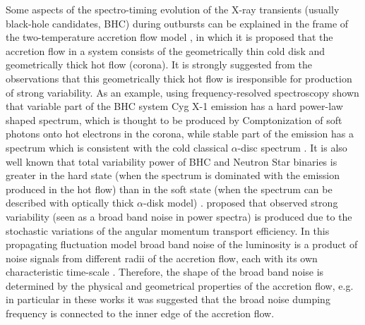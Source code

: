 \documentclass[a4paper,fleqn,usenatbib]{mnras}
\begin{document}
Some aspects of the spectro-timing evolution of the X-ray transients (usually black-hole candidates, BHC) during outbursts can be explained in the frame of the two-temperature accretion flow model \citep{1975ApJ...199L.153E, 1976ApJ...204..187S, 1995ApJ...452..710N}, in which it is proposed that the accretion flow in a system consists of the geometrically thin cold disk and geometrically thick hot flow (corona). 
It is strongly suggested from the observations that this geometrically thick hot flow is iresponsible for production of strong variability. 
As an example, using frequency-resolved spectroscopy \citet{2001MNRAS.321..759C} shown that variable part of the BHC system Cyg X-1 emission has a hard power-law shaped spectrum, which is thought to be produced by Comptonization of soft photons onto hot electrons in the corona, while stable part of the emission has a spectrum which is consistent with the cold classical $\alpha$-disc spectrum \citep{shakura73}.  
It is also well known that total variability power of BHC and Neutron Star binaries is greater in the hard state (when the spectrum is dominated with the emission produced in the hot flow) than in the soft state (when the spectrum can be described with optically thick $\alpha$-disk model) \citep[][e.t.c.]{1992ApJ...391L..21M, 2000A&A...363.1013R, 2001ApJS..132..377H, 2001MNRAS.321..759C}. 
\citet{1997MNRAS.292..679L} proposed that observed strong variability (seen as a broad band noise in power spectra) is produced due to the stochastic variations of the angular momentum transport efficiency. 
In this propagating fluctuation model broad band noise of the luminosity is a product of noise signals from different radii of the accretion flow, each with its own characteristic time-scale \citep[see, e.g.][]{2006MNRAS.367..801A, 2013MNRAS.434.1476I}. 
Therefore, the shape of the broad band noise is determined by the physical and geometrical properties of the accretion flow, e.g. in particular in these works it was suggested that the broad noise dumping frequency is connected to the inner edge of the accretion flow. 
\end{document}
